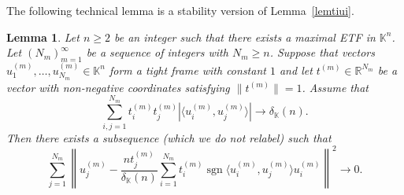 \documentclass[12pt, reqno]{amsart}
\newtheorem{lem}[twr]{Lemma}
\theoremstyle{definition}
\theoremstyle{remark}
\numberwithin{equation}{section}
\DeclareMathOperator{\sgn}{sgn}
\begin{document}
The following technical lemma is a stability version of Lemma~\ref{lemtiui}.

\begin{lem} 
\label{lemtiuistab} 
Let $n\geq 2$ be an integer such that there exists a maximal ETF in $\mathbb K^n$. 
Let $(N_m)_{m=1}^\infty$ be a sequence of integers with $N_m\geq n$. Suppose that vectors $u_1^{(m)},\ldots,u_{N_m}^{(m)}\in\mathbb K^n$ form a tight frame with constant $1$ and let $t^{(m)}\in\mathbb R^{N_m}$ be a vector with non-negative coordinates satisfying $\|t^{(m)}\|=1$. Assume that 
$$ \sum_{i,j=1}^{N_m} t_i^{(m)}t_j^{(m)} |\langle u_i^{(m)},u_j^{(m)}\rangle| \to \delta_{\mathbb K}(n). $$ 
Then there exists a subsequence (which we do not relabel) such that
$$\sum_{j=1}^{N_m} \left\| u_j^{(m)} - \frac{nt_j^{(m)}}{\delta_{\mathbb K}(n)} \sum_{i=1}^{N_m} t_i^{(m)} \sgn \langle u_i^{(m)}, u_j^{(m)}\rangle u_i^{(m)} \right\|^2 \to 0. $$ 
\end{lem}
\end{document}
